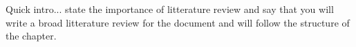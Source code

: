 \chapter{\chapzerotitle}

Quick intro... state the importance of litterature review and say that you will write a broad litterature review for the document and will follow the structure of the chapter. 

\section{\chaplidartitle}
\label{sec:chap1_litterature_review_1}

\section{\chaptraversabilitytitle}
\label{sec:chap1_litterature_review_2}

\section{\chapslamtitle}
\label{sec:chap1_litterature_review_3}


